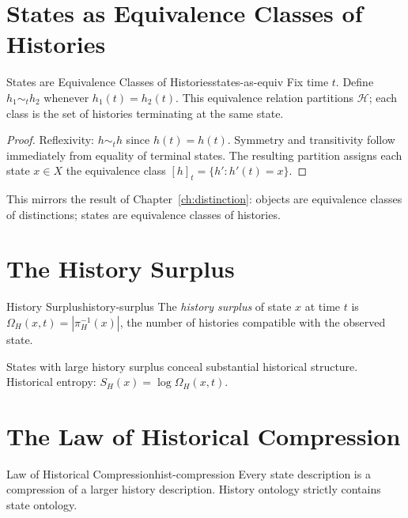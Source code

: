 \documentclass[12pt,twoside,openright]{book}
\newcommand{\hist}{\mathcal{H}}
\begin{document}
\section{States as Equivalence Classes of Histories}
\label{sec:ch4-equiv}

\begin{proposition}{States are Equivalence Classes of
  Histories}{states-as-equiv}
  Fix time $t$. Define $h_1 \sim_t h_2$ whenever
  $h_1(t) = h_2(t)$. This equivalence relation
  partitions $\hist$; each class is the set of histories
  terminating at the same state.
\end{proposition}

\begin{proof}
  Reflexivity: $h \sim_t h$ since $h(t) = h(t)$.
  Symmetry and transitivity follow immediately from
  equality of terminal states.
  The resulting partition assigns each state $x \in X$
  the equivalence class $[h]_t = \{h' : h'(t) = x\}$.
\end{proof}

This mirrors the result of Chapter~\ref{ch:distinction}:
objects are equivalence classes of distinctions; states are
equivalence classes of histories.

\section{The History Surplus}
\label{sec:ch4-surplus}

\begin{definition}{History Surplus}{history-surplus}
  The \emph{history surplus} of state $x$ at time $t$ is
  $\Omega_H(x,t) = |\pi_H^{-1}(x)|$,
  the number of histories compatible with the observed state.
\end{definition}

States with large history surplus conceal substantial
historical structure. Historical entropy:
$S_H(x) = \log\Omega_H(x,t)$.

\section{The Law of Historical Compression}
\label{sec:ch4-law}

\begin{law}{Law of Historical Compression}{hist-compression}
  Every state description is a compression of a larger
  history description. History ontology strictly contains
  state ontology.
\end{law}
\end{document}
